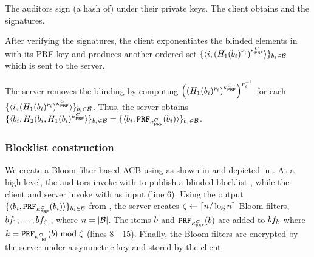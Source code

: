\item The auditors sign (a hash of) \blindedBlocklist under their private keys. The client obtains \blindedBlocklist and the signatures. 

\item After verifying the signatures, the client exponentiates the blinded elements in \blindedBlocklist with its PRF key \prfKeyClient and produces another ordered set $\{ \langle \setIdx, \left(\oprfRO[1](\genericBlocklistElmt[\setIdx])^{\oprfBlindingFactor[\setIdx]}\right)^{\prfKeyClient}\rangle\}_{\genericBlocklistElmt[\setIdx] \in \blocklist}$ which is sent to the server. 

\item The server removes the blinding by computing $\left(\left(\oprfRO[1](\genericBlocklistElmt[\setIdx])^{\oprfBlindingFactor[\setIdx]}\right)^{\prfKeyClient}\right)^{\oprfBlindingFactor[\setIdx]^{-1}}$ for each $\{ \langle \setIdx, \left(\oprfRO[1](\genericBlocklistElmt[\setIdx])^{\oprfBlindingFactor[\setIdx]}\right)^{\prfKeyClient}\rangle\}_{\genericBlocklistElmt[\setIdx] \in \blocklist}$. Thus, the server obtains
$\{ \langle \genericBlocklistElmt_\setIdx, \oprfRO[2](\genericBlocklistElmt[\setIdx], \oprfRO[1](\genericBlocklistElmt[\setIdx])^{\prfKeyClient} \rangle \}_{\genericBlocklistElmt[\setIdx] \in \blocklist} = \{ \langle \genericBlocklistElmt_\setIdx, \prf{\prfKeyClient}(\genericBlocklistElmt[\setIdx]) \rangle \}_{\genericBlocklistElmt[\setIdx] \in \blocklist}$. 
\enumListEnd




\subsubsection{Blocklist construction}
%
We create a Bloom-filter-based ACB \bfBlklistToken using \authOPRFFunc as shown in  and depicted in .  At a high level, the auditors invoke \authOPRFFunc with \publishList to publish a blinded blocklist \blindedBlocklist, while the client and server invoke \evaluate with \blindedBlocklist as input (line 6). Using the output $\{ \langle \genericBlocklistElmt_\setIdx, \prf{\prfKeyClient}(\genericBlocklistElmt[\setIdx]) \rangle \}_{\genericBlocklistElmt[\setIdx] \in \blocklist}$ from \authOPRFFunc, the server creates $\zeta \gets \lceil n/\log n \rceil$ Bloom filters, $\bloomFilter[1], \dots, \bloomFilter[\numBins]$ , where $\blocklistSize = \setSize{\blocklist}$. The items $\genericBlocklistElmt$ and $\prf{\prfKeyClient}(\genericBlocklistElmt)$ are added to $\bloomFilter[\bloomFilterIdx]$ where $\bloomFilterIdx = \prf{\prfKeyClient}(\genericBlocklistElmt) \bmod \numBins$ (lines 8 - 15).  Finally, the Bloom filters are encrypted by the server under a symmetric key and stored by the client. 



